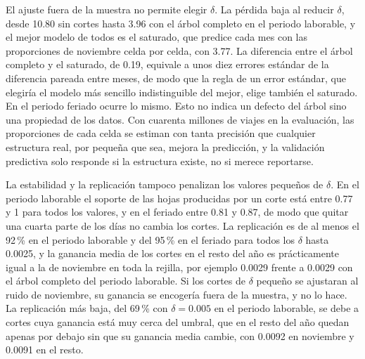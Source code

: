El ajuste fuera de la muestra no permite elegir $\delta$. La pérdida baja al
reducir $\delta$, desde 10.80 sin cortes hasta 3.96 con el árbol completo en el
periodo laborable, y el mejor modelo de todos es el saturado, que predice cada mes
con las proporciones de noviembre celda por celda, con 3.77. La diferencia entre
el árbol completo y el saturado, de 0.19, equivale a unos diez errores estándar de
la diferencia pareada entre meses, de modo que la regla de un error estándar, que
elegiría el modelo más sencillo indistinguible del mejor, elige también el
saturado. En el periodo feriado ocurre lo mismo. Esto no indica un defecto del
árbol sino una propiedad de los datos. Con cuarenta millones de viajes en la
evaluación, las proporciones de cada celda se estiman con tanta precisión que
cualquier estructura real, por pequeña que sea, mejora la predicción, y la
validación predictiva solo responde si la estructura existe, no si merece
reportarse.

La estabilidad y la replicación tampoco penalizan los valores pequeños de
$\delta$. En el periodo laborable el soporte de las hojas producidas por un corte
está entre 0.77 y 1 para todos los valores, y en el feriado entre 0.81 y 0.87, de
modo que quitar una cuarta parte de los días no cambia los cortes. La replicación
es de al menos el 92\,\% en el periodo laborable y del 95\,\% en el feriado para
todos los $\delta$ hasta 0.0025, y la ganancia media de los cortes en el resto del
año es prácticamente igual a la de noviembre en toda la rejilla, por ejemplo
0.0029 frente a 0.0029 con el árbol completo del periodo laborable. Si los cortes
de $\delta$ pequeño se ajustaran al ruido de noviembre, su ganancia se encogería
fuera de la muestra, y no lo hace. La replicación más baja, del 69\,\% con
$\delta = 0.005$ en el periodo laborable, se debe a cortes cuya ganancia está muy
cerca del umbral, que en el resto del año quedan apenas por debajo sin que su
ganancia media cambie, con 0.0092 en noviembre y 0.0091 en el resto.

